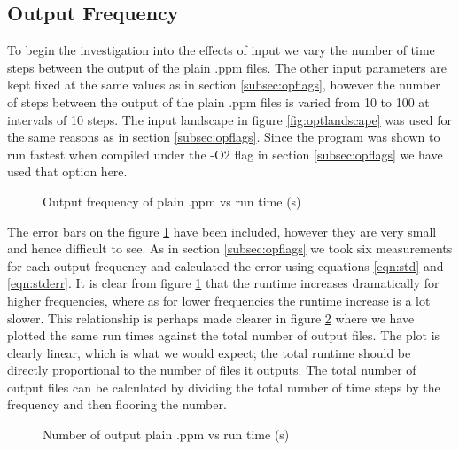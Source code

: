 \subsection{Output Frequency}
\label{subsec:outfreq}
To begin the investigation into the effects of input we vary the number of time steps between the output of the plain .ppm files. The other input parameters are kept fixed at the same values as in section \ref{subsec:opflags}, however the number of steps between the output of the plain .ppm files is varied from 10 to 100 at intervals of 10 steps. The input landscape in figure \ref{fig:optlandscape} was used for the same reasons as in section \ref{subsec:opflags}. Since the program was shown to run fastest when compiled under the -O2 flag in section \ref{subsec:opflags} we have used that option here. 
\begin{figure}[!h]
\centering
{}
\caption{Output frequency of plain .ppm vs run time (s)}
\label{fig:outfreqgraph}
\end{figure}

The error bars on the figure \ref{fig:outfreqgraph} have been included, however they are very small and hence difficult to see. As in section \ref{subsec:opflags} we took six measurements for each output frequency and calculated the error using equations \ref{eqn:std} and \ref{eqn:stderr}. It is clear from figure \ref{fig:outfreqgraph} that the runtime increases dramatically for higher frequencies, where as for lower frequencies the runtime increase is a lot slower. This relationship is perhaps made clearer in figure \ref{fig:outnumbgraph} where we have plotted the same run times against the total number of output files. The plot is clearly linear, which is what we would expect; the total runtime should be directly proportional to the number of files it outputs. The total number of output files can be calculated by dividing the total number of time steps by the frequency and then flooring the number.

\begin{figure}[!h]
\centering
{}
\caption{Number of output plain .ppm vs run time (s)}
\label{fig:outnumbgraph}
\end{figure}

